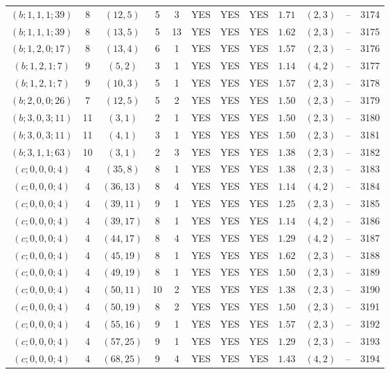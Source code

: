 \begin{longtable}{|c|c|c|c|c|c|c|c|c|c|c|c|}
$(b;1,1,1;39)$ & 8 & $(12,5)$ & 5 & 3 & YES & YES & YES & $1.71$ & $(2,3)$ & -- & 3174\\
$(b;1,1,1;39)$ & 8 & $(13,5)$ & 5 & 13 & YES & YES & YES & $1.62$ & $(2,3)$ & -- & 3175\\
$(b;1,2,0;17)$ & 8 & $(13,4)$ & 6 & 1 & YES & YES & YES & $1.57$ & $(2,3)$ & -- & 3176\\
$(b;1,2,1;7)$ & 9 & $(5,2)$ & 3 & 1 & YES & YES & YES & $1.14$ & $(4,2)$ & -- & 3177\\
$(b;1,2,1;7)$ & 9 & $(10,3)$ & 5 & 1 & YES & YES & YES & $1.57$ & $(2,3)$ & -- & 3178\\
$(b;2,0,0;26)$ & 7 & $(12,5)$ & 5 & 2 & YES & YES & YES & $1.50$ & $(2,3)$ & -- & 3179\\
$(b;3,0,3;11)$ & 11 & $(3,1)$ & 2 & 1 & YES & YES & YES & $1.50$ & $(2,3)$ & -- & 3180\\
$(b;3,0,3;11)$ & 11 & $(4,1)$ & 3 & 1 & YES & YES & YES & $1.50$ & $(2,3)$ & -- & 3181\\
$(b;3,1,1;63)$ & 10 & $(3,1)$ & 2 & 3 & YES & YES & YES & $1.38$ & $(2,3)$ & -- & 3182\\
$(c;0,0,0;4)$ & 4 & $(35,8)$ & 8 & 1 & YES & YES & YES & $1.38$ & $(2,3)$ & -- & 3183\\
$(c;0,0,0;4)$ & 4 & $(36,13)$ & 8 & 4 & YES & YES & YES & $1.14$ & $(4,2)$ & -- & 3184\\
$(c;0,0,0;4)$ & 4 & $(39,11)$ & 9 & 1 & YES & YES & YES & $1.25$ & $(2,3)$ & -- & 3185\\
$(c;0,0,0;4)$ & 4 & $(39,17)$ & 8 & 1 & YES & YES & YES & $1.14$ & $(4,2)$ & -- & 3186\\
$(c;0,0,0;4)$ & 4 & $(44,17)$ & 8 & 4 & YES & YES & YES & $1.29$ & $(4,2)$ & -- & 3187\\
$(c;0,0,0;4)$ & 4 & $(45,19)$ & 8 & 1 & YES & YES & YES & $1.62$ & $(2,3)$ & -- & 3188\\
$(c;0,0,0;4)$ & 4 & $(49,19)$ & 8 & 1 & YES & YES & YES & $1.50$ & $(2,3)$ & -- & 3189\\
$(c;0,0,0;4)$ & 4 & $(50,11)$ & 10 & 2 & YES & YES & YES & $1.38$ & $(2,3)$ & -- & 3190\\
$(c;0,0,0;4)$ & 4 & $(50,19)$ & 8 & 2 & YES & YES & YES & $1.50$ & $(2,3)$ & -- & 3191\\
$(c;0,0,0;4)$ & 4 & $(55,16)$ & 9 & 1 & YES & YES & YES & $1.57$ & $(2,3)$ & -- & 3192\\
$(c;0,0,0;4)$ & 4 & $(57,25)$ & 9 & 1 & YES & YES & YES & $1.29$ & $(2,3)$ & -- & 3193\\
$(c;0,0,0;4)$ & 4 & $(68,25)$ & 9 & 4 & YES & YES & YES & $1.43$ & $(4,2)$ & -- & 3194\\

\end{longtable}
